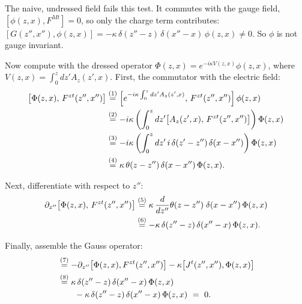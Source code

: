 The naive, undressed field fails this test. It commutes with the gauge field, $[\phi(z,x), F^{Mt}] = 0$, so only
the charge term contributes:
$[G(z'',x''),\phi(z,x)]=-\kappa\,\delta(z''-z)\,\delta(x''-x)\,\phi(z,x)\ne0$. So $\phi$ is not gauge invariant.

Now compute with the dressed operator $\Phi(z,x) = e^{-i\kappa V(z,x)}\phi(z,x)$, where
$V(z,x) = \int_0^z dz' A_z(z',x)$. First, the commutator with the electric field:
\begin{align}
\big[\Phi(z,x),\, F^{zt}(z'',x'')\big]
&\overset{(1)}{=} \Big[e^{-i\kappa \int_0^z dz' A_z(z',x)},\, F^{zt}(z'',x'')\Big]\,\phi(z,x) \notag\\
&\overset{(2)}{=} -i\kappa \left(\int_0^z dz' \big[A_z(z',x),\, F^{zt}(z'',x'')\big]\right) \Phi(z,x) \notag\\
&\overset{(3)}{=} -i\kappa \left(\int_0^z dz' \, i\,\delta(z'-z'')\,\delta(x-x'')\right) \Phi(z,x) \notag\\
&\overset{(4)}{=} \kappa\,\theta(z - z'')\,\delta(x - x'')\,\Phi(z,x) . \notag
\end{align}
\quad
{}\quad
{}\quad
{}

Next, differentiate with respect to $z''$:
\begin{align}
\partial_{z''} \big[\Phi(z,x),\, F^{zt}(z'',x'')\big]
&\overset{(5)}{=} \kappa\, \frac{d}{dz''}\theta(z - z'')\;\delta(x - x'')\,\Phi(z,x) \notag\\
&\overset{(6)}{=} -\kappa\,\delta(z'' - z)\,\delta(x'' - x)\,\Phi(z,x) . \notag
\end{align}
\quad
{}

Finally, assemble the Gauss operator:
\begin{align}
[G(z'',x''),\Phi(z,x)]
&\eqstep{7} -\partial_{z''}\big[\Phi(z,x),F^{zt}(z'',x'')\big] - \kappa\big[J^t(z'',x''),\Phi(z,x)\big] \notag\\
&\eqstep{8} \kappa\,\delta(z''-z)\,\delta(x''-x)\,\Phi(z,x) \notag\\
&\qquad - \kappa\,\delta(z''-z)\,\delta(x''-x)\,\Phi(z,x) \ =\ 0 . \notag
\end{align}
\quad
{}

